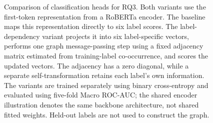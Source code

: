 \begin{figure}[t]
{%
}
\caption{Comparison of classification heads for RQ3. Both variants use the first-token representation from a RoBERTa encoder. The baseline maps this representation directly to six label scores. The label-dependency variant projects it into six label-specific vectors, performs one graph message-passing step using a fixed adjacency matrix estimated from training-label co-occurrence, and scores the updated vectors. The adjacency has a zero diagonal, while a separate self-transformation retains each label's own information. The variants are trained separately using binary cross-entropy and evaluated using five-fold Macro ROC-AUC; the shared encoder illustration denotes the same backbone architecture, not shared fitted weights. Held-out labels are not used to construct the graph.}
\label{fig:rq3-label-dependency}
\end{figure}
